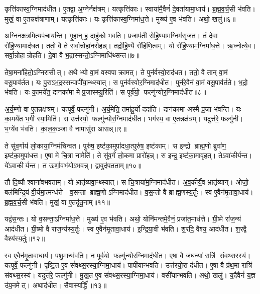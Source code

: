 कृत्ति॑कास्व॒ग्निमाद॑धीत। ए॒तद्वा अ॒ग्नेर्नक्ष॑त्रम्। यत्कृत्ति॑काः। स्वाया॑मै॒वैनं॑ दे॒वता॑यामा॒धाय॑। ब्र॒ह्म॒व॒र्च॒सी भ॑वति। मुखं॒ वा ए॒तन्नक्ष॑त्राणाम्। यत्कृत्ति॑काः। यः कृत्ति॑कास्व॒ग्निमा॑ध॒त्ते। मुख्य॑ ए॒व भ॑वति। अथो॒ खलु॑॥६॥

अ॒ग्नि॒न॒क्ष॒त्रमित्यप॑चायन्ति। गृ॒हान् ह॒ दाहु॑को भवति। प्र॒जाप॑ती रोहि॒ण्याम॒ग्निम॑सृजत। तं दे॒वा रो॑हि॒ण्यामाद॑धत। ततो॒ वै ते सर्वा॒न्रोहा॑नरोहन्न्। तद्रो॑हि॒ण्यै रो॑हिणि॒त्वम्। यो रो॑हि॒ण्याम॒ग्निमा॑ध॒त्ते। ऋ॒ध्नोत्ये॒व। सर्वा॒न्रोहान्रोहति। दे॒वा वै भ॒द्रास्सन्तो॒ऽग्निमाधि॑थ्सन्त॥७॥

तेषा॒मना॑हितो॒ऽग्निरासीत्। अथैभ्यो वा॒मं वस्वपाक्रामत्। ते पुन॑र्वस्वो॒राद॑धत। ततो॒ वै तान् वा॒मं वसू॒पाव॑र्तत। यः पु॒राऽभ॒द्रस्सन्पापी॑या॒न्थ्स्यात्। स पुन॑र्वस्वोर॒ग्निमाद॑धीत। पुन॑रे॒वैनं॑ वा॒मं वसू॒पाव॑र्तते। भ॒द्रो भ॑वति। यः का॒मये॑त॒ दानका॑मा मे प्र॒जास्स्यु॒रिति॑। स पूर्व॑यो॒ फल्गु॑न्योर॒ग्निमाद॑धीत॥८॥

अ॒र्य॒म्णो वा ए॒तन्नक्ष॑त्रम्। यत्पूर्वे॒ फल्गु॑नी। अ॒र्य॒मेति॒ तमा॑हु॒र्यो ददा॑ति। दान॑कामा अस्मै प्र॒जा भ॑वन्ति। यः का॒मये॑त भ॒गी स्या॒मिति॑। स उत्त॑रयो॒ फल्गु॑न्योर॒ग्निमाद॑धीत। भग॑स्य॒ वा ए॒तन्नक्ष॑त्रम्। यदुत्त॑रे॒ फल्गु॑नी। भ॒ग्ये॑व भ॑वति। का॒ल॒क॒ञ्जा वै नामासु॑रा आसन्न्॥९॥

ते सु॑व॒र्गाय॑ लो॒काया॒ग्निम॑चिन्वत। पुरु॑ष॒ इष्ट॑का॒मुपा॑दधा॒त्पुरु॑ष॒ इष्ट॑काम्। स इन्द्रो ब्राह्म॒णो ब्रुवा॑ण॒ इष्ट॑का॒मुपा॑धत्त। ए॒षा मे॑ चि॒त्रा नामेति॑। ते सु॑व॒र्गं लो॒कमा प्रारो॑हन्न्। स इन्द्र॒ इष्ट॑का॒मावृ॑हत्। तेऽवा॑कीर्यन्त। ये॑ऽवाकीर्यन्त। त ऊर्णा॒वभ॑योऽभवन्न्। द्वावुद॑पतताम्॥१०॥

तौ दि॒व्यौ श्वाना॑वभवताम्। यो भ्रातृ॑व्यवा॒न्थ्स्यात्। स चि॒त्राया॑म॒ग्निमाद॑धीत। अ॒व॒कीर्यै॒व भ्रातृ॑व्यान्। ओजो॒ बल॑मिन्द्रि॒यं वी॒र्य॑मा॒त्मन्ध॑त्ते। व॒सन्ता ब्राह्म॒णोऽग्निमाद॑धीत। व॒स॒न्तो वै ब्राह्म॒णस्य॒र्तुः। स्व ए॒वैन॑मृ॒तावा॒धाय॑। ब्र॒ह्म॒व॒र्च॒सी भ॑वति। मुखं॒ वा ए॒तदृ॑तू॒नाम्॥११॥

यद्व॑स॒न्तः। यो व॒सन्ता॒ऽग्निमा॑ध॒त्ते। मुख्य॑ ए॒व भ॑वति। अथो॒ योनि॑मन्तमे॒वैनं॒ प्रजा॑त॒माध॑त्ते। ग्री॒ष्मे रा॑ज॒न्य॑ आद॑धीत। ग्री॒ष्मो वै रा॑ज॒न्य॑स्य॒र्तुः। स्व ए॒वैन॑मृ॒तावा॒धाय॑। इ॒न्द्रि॒या॒वी भ॑वति। श॒रदि॒ वैश्य॒ आद॑धीत। श॒रद्वै वैश्य॑स्य॒र्तुः॥१२॥

स्व ए॒वैन॑मृ॒तावा॒धाय॑। प॒शु॒मान्भ॑वति। न पूर्व॑यो॒ फल्गु॑न्योर॒ग्निमाद॑धीत। ए॒षा वै ज॑घ॒न्या॑ रात्रि॑ संवथ्स॒रस्य॑। यत्पूर्वे॒ फल्गु॑नी। पृ॒ष्टि॒त ए॒व सं॑वथ्स॒रस्या॒ग्निमा॒धाय॑। पापी॑यान्भवति। उत्त॑रयो॒रा द॑धीत। ए॒षा वै प्र॑थ॒मा रात्रि॑ संवथ्स॒रस्य॑। यदुत्त॑रे॒ फल्गु॑नी। मु॒ख॒त ए॒व सं॑वथ्स॒रस्या॒ग्निमा॒धाय॑। वसी॑यान्भवति। अथो॒ खलु॑। य॒दैवैनं॑ य॒ज्ञ उ॑प॒नमेत्। अथाद॑धीत। सैवास्यर्द्धि॑॥१३॥
\anuvakamend[खल्वा॑धिथ्सन्त॒ फल्गु॑न्योर॒ग्निमाद॑धीतासन्नपततामृतू॒नां वैश्य॑स्य॒र्तुरुत्त॑रे॒ फल्गु॑नी॒ षट्च॑]

